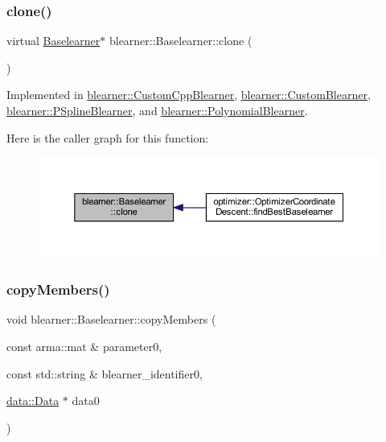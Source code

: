 \subsubsection{\texorpdfstring{clone()}{clone()}}
{\footnotesize\ttfamily virtual \mbox{\hyperlink{classblearner_1_1_baselearner}{Baselearner}}$\ast$ blearner\+::\+Baselearner\+::clone (\begin{DoxyParamCaption}{ }\end{DoxyParamCaption})\hspace{0.3cm}{\ttfamily [pure virtual]}}



Implemented in \mbox{\hyperlink{classblearner_1_1_custom_cpp_blearner_a8b76705131d397974cd208fdcfd70496}{blearner\+::\+Custom\+Cpp\+Blearner}}, \mbox{\hyperlink{classblearner_1_1_custom_blearner_a7ceeee2b7fffd11f376018bc1d3cfba1}{blearner\+::\+Custom\+Blearner}}, \mbox{\hyperlink{classblearner_1_1_p_spline_blearner_a6fca532d2d20dfa284acc474ee1d7531}{blearner\+::\+P\+Spline\+Blearner}}, and \mbox{\hyperlink{classblearner_1_1_polynomial_blearner_a4a93ace818c330e5d1f572108ba061c0}{blearner\+::\+Polynomial\+Blearner}}.

Here is the caller graph for this function\+:
\nopagebreak
\begin{figure}[H]
\begin{center}
\leavevmode
\includegraphics[width=350pt]{classblearner_1_1_baselearner_a8e12c6739f085917a7d2da6570c51a21_icgraph}
\end{center}
\end{figure}
\mbox{\label{classblearner_1_1_baselearner_ae8f114ca7c497f03c80de5981c7f811d}} 
\subsubsection{\texorpdfstring{copy\+Members()}{copyMembers()}}
{\footnotesize\ttfamily void blearner\+::\+Baselearner\+::copy\+Members (\begin{DoxyParamCaption}\item[{const arma\+::mat \&}]{parameter0,  }\item[{const std\+::string \&}]{blearner\+\_\+identifier0,  }\item[{\mbox{\hyperlink{classdata_1_1_data}{data\+::\+Data}} $\ast$}]{data0 }\end{DoxyParamCaption})}

